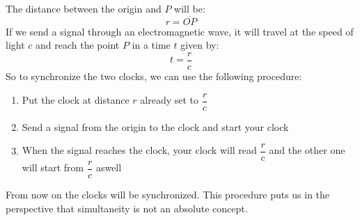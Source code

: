 The distance between the origin and $P$ will be:
\begin{equation}
  r = \overline{OP}
\end{equation}
If we send a signal through an electromagnetic wave, it will travel at the speed of light $c$ and reach the point $P$ in a time $t$ given by:
\begin{equation}
  t = \dfrac{r}{c}
\end{equation}
So to synchronize the two clocks, we can use the following procedure:
\begin{enumerate}
  \item Put the clock at distance $r$ already set to $\dfrac{r}{c}$
  \item Send a signal from the origin to the clock and start your clock
  \item When the signal reaches the clock, your clock will read $\dfrac{r}{c}$ and the other one will start from $\dfrac{r}{c}$ aswell
\end{enumerate}
From now on the clocks will be synchronized. This procedure puts us in the perspective that simultaneity is not an absolute concept.
